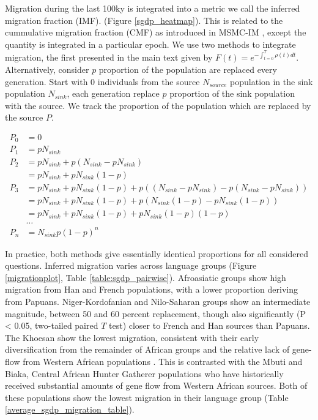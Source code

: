 Migration during the last 100ky is integrated into a metric we call the inferred migration fraction (IMF). (Figure \ref{sgdp_heatmap}). This is related to the cummulative migration fraction (CMF) as introduced in MSMC-IM \cite{Wang2019a}, except the quantity is integrated in a particular epoch. We use two methods to integrate migration, the first presented in the main text given by $F(t) = e^{- \int_{t=0}^T \rho(t) dt}$. Alternatively, consider $p$ proportion of the population are replaced every generation. Start with 0 individuals from the source $N_{source}$ population in the sink population $N_{sink}$, each generation replace $p$ proportion of the sink population with the source. We track the proportion of the population which are replaced by the source $P$.  

$$ \begin{aligned} P_0 &= 0 \\ P_1 &= pN_{sink} \\ P_2 &= pN_{sink} + p(N_{sink} - pN_{sink}) \\ &= pN_{sink} + pN_{sink}(1-p) \\ P_3 &= pN_{sink} + pN_{sink}(1-p) + p((N_{sink}-pN_{sink}) - p(N_{sink}-pN_{sink})) \\ &= pN_{sink} + pN_{sink}(1-p)+p(N_{sink}(1-p)-pN_{sink}(1-p)) \\ &= pN_{sink}+pN_{sink}(1-p)+pN_{sink}(1-p)(1-p) \\ &\dots \\ P_n &=N_{sink}p(1-p)^n \end{aligned} $$

In practice, both methods give essentially identical proportions for all considered questions. Inferred migration varies across language groups (Figure \ref{migrationplot}, Table \ref{table:sgdp_pairwise}). Afroasiatic groups show high migration from Han and French populations, with a lower proportion deriving from Papuans. Niger-Kordofanian and Nilo-Saharan groups show an intermediate magnitude, between 50 and 60 percent replacement, though also significantly (P < 0.05, two-tailed paired $T$ test) closer to French and Han sources than Papuans. The Khoesan show the lowest migration, consistent with their early diversification from the remainder of African groups and the relative lack of gene-flow from Western African populations \cite{Lipson2019}. This is contrasted with the Mbuti and Biaka, Central African Hunter Gatherer populations who have historically received substantial amounts of gene flow from Western African sources. Both of these populations show the lowest migration in their language group (Table \ref{average_sgdp_migration_table}).  

